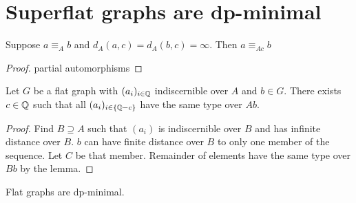 \documentclass{amsart}
\begin{document}
\section{Superflat graphs are dp-minimal}

\begin{Lemma}
	Suppose $a \equiv_A b$ and $d_A(a, c) = d_A(b, c) = \infty$. Then $a \equiv_{Ac} b$
\end{Lemma}

\begin{proof}
	partial automorphisms
\end{proof}

\begin{Theorem}
	Let $G$ be a flat graph with $(a_i)_{i\in\mathbb{Q}}$ indiscernible over $A$ and $b \in G$. There exists $c \in \mathbb{Q}$ such that all $(a_i)_{i\in\{\mathbb{Q} - c\}}$ have the same type over $Ab$.
\end{Theorem}

\begin{proof}
	Find $B \supseteq A$ such that $(a_i)$ is indiscernible over $B$ and has infinite distance over $B$. $b$ can have finite distance over $B$ to only one member of the sequence. Let $C$ be that member. Remainder of elements have the same type over $Bb$ by the lemma.
\end{proof}

\begin{Corollary}
	Flat graphs are dp-minimal.
\end{Corollary}
\end{document}
